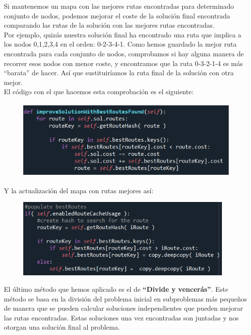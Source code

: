 \documentclass[11pt]{article} %
\begin{document}
\begin{enumerate}
Si mantenemos un mapa con las mejores rutas encontradas para determinado conjunto de nodos, podemos mejorar el coste de la solución final encontrada comparando las rutas de la solución con las mejores rutas encontradas. \\

Por ejemplo, quizás nuestra solución final ha encontrado una ruta que implica a los nodos 0,1,2,3,4 en el orden: 0-2-3-4-1. Como hemos guardado la mejor ruta encontrada para cada conjunto de nodos, comprobamos si hay alguna manera de recorrer esos nodos con menor coste, y encontramos que la ruta 0-3-2-1-4 es más “barata” de hacer. Así que sustituiríamos la ruta final de la solución con otra mejor.\\

El código con el que hacemos esta comprobación es el siguiente:

\begin{figure}[h]
\centering
\includegraphics[width=0.8\linewidth, height=4cm]{improveSolutionWithBestRoutesFound.png} 
\label{fig:subim1}
\end{figure}

Y la actualización del mapa con rutas mejores así:

\begin{figure}[h]
\centering
\includegraphics[width=0.8\linewidth, height=4cm]{routeHashUpdate.png} 
\label{fig:subim1}
\end{figure}

El último método que hemos aplicado es el de \textbf{“Divide y vencerás”}. Este método se basa en la división del problema inicial en subproblemas más pequeños de manera que se pueden calcular soluciones independientes que pueden mejorar las rutas encontradas. Estas soluciones una vez encontradas son juntadas y nos otorgan una solución final al problema.\\


\end{enumerate}
\end{document}
